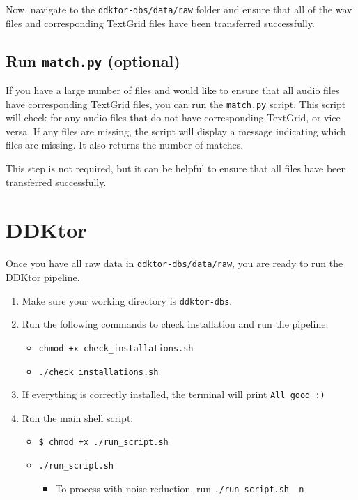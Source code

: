 \documentclass[
]{book}
\providecommand{\tightlist}{%
  \setlength{\itemsep}{0pt}\setlength{\parskip}{0pt}}
\begin{document}
Now, navigate to the \texttt{ddktor-dbs/data/raw} folder and ensure that all of the wav files and corresponding TextGrid files have been transferred successfully.

\section{\texorpdfstring{Run \texttt{match.py} (optional)}{Run match.py (optional)}}\label{run-match.py-optional}

If you have a large number of files and would like to ensure that all audio files have corresponding TextGrid files, you can run the \texttt{match.py} script. This script will check for any audio files that do not have corresponding TextGrid, or vice versa. If any files are missing, the script will display a message indicating which files are missing. It also returns the number of matches.

This step is not required, but it can be helpful to ensure that all files have been transferred successfully.

\chapter{DDKtor}\label{ddktor}

Once you have all raw data in \texttt{ddktor-dbs/data/raw}, you are ready to run the DDKtor pipeline.

\begin{enumerate}
\def\labelenumi{\arabic{enumi}.}
\tightlist
\item
  Make sure your working directory is \texttt{ddktor-dbs}.
\item
  Run the following commands to check installation and run the pipeline:

  \begin{itemize}
  \tightlist
  \item
    \texttt{chmod\ +x\ check\_installations.sh}
  \item
    \texttt{./check\_installations.sh}
  \end{itemize}
\item
  If everything is correctly installed, the terminal will print \texttt{All\ good\ :)}
\item
  Run the main shell script:

  \begin{itemize}
  \tightlist
  \item
    \texttt{\$\ chmod\ +x\ ./run\_script.sh}
  \item
    \texttt{./run\_script.sh}

    \begin{itemize}
    \tightlist
    \item
      To process with noise reduction, run \texttt{./run\_script.sh\ -n}
    \end{itemize}
  \end{itemize}
\end{enumerate}
\end{document}
